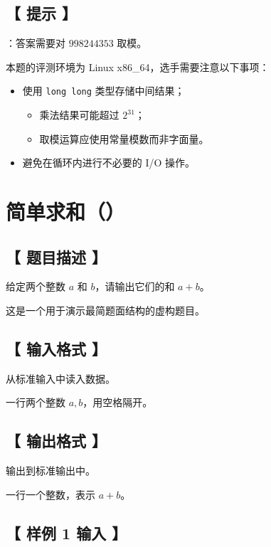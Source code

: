 \documentclass{statement}
\begin{document}
\subsection[ 提示 ]{【 提示 】}

：答案需要对 $998244353$ 取模。

本题的评测环境为 Linux x86\_64，选手需要注意以下事项：

\begin{itemize}
  \item 使用 \texttt{long long} 类型存储中间结果；

\begin{itemize}
  \item 乘法结果可能超过 $2^{31}$；
  \item 取模运算应使用常量模数而非字面量。
\end{itemize}
  \item 避免在循环内进行不必要的 I/O 操作。
\end{itemize}



\newpage

\section{ 简单求和（）}

\subsection[ 题目描述 ]{【 题目描述 】}

给定两个整数 $a$ 和 $b$，请输出它们的和 $a + b$。

这是一个用于演示最简题面结构的虚构题目。


\subsection[ 输入格式 ]{【 输入格式 】}

从标准输入中读入数据。

一行两个整数 $a, b$，用空格隔开。


\subsection[ 输出格式 ]{【 输出格式 】}

输出到标准输出中。

一行一个整数，表示 $a + b$。


\subsection[ 样例 1 输入 ]{【 样例 1 输入 】}
\end{document}
